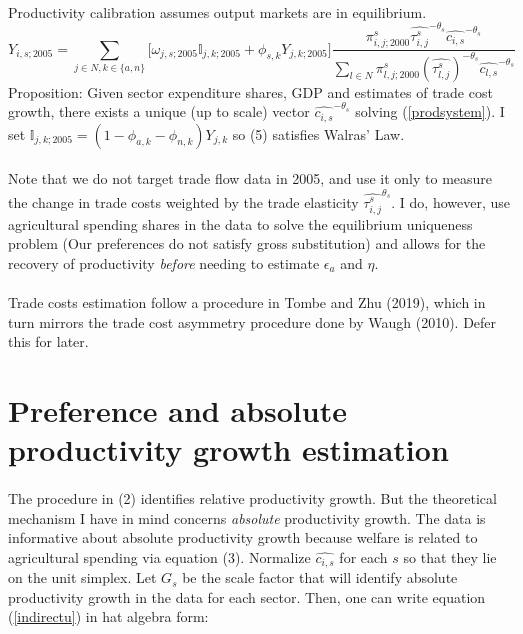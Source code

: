 \documentclass[]{article}
\begin{document}
\paragraph*{}
Productivity calibration assumes output markets are in equilibrium.
\begin{equation} \label{prodsystem}
	Y_{i, s; 2005} = \sum_{j \in N, k \in \{a, n\}}\bigg[\omega_{j, s; 2005}\mathbb{I}_{j, k; 2005} + \phi_{s, k}Y_{j, k; 2005}\bigg] \frac{\pi_{i, j; 2000}^{s}\hat{\tau^{s}_{i, j}}^{-\theta_{s}}\hat{c_{i, s}}^{-\theta_{s}}}{\sum_{l \in N}\pi_{l, j; 2000}^{s}(\hat{\tau_{l, j}^{s}})^{-\theta_{s}}\hat{c_{l, s}}^{-\theta_{s}}} 
\end{equation}
Proposition: Given sector expenditure shares, GDP and estimates of trade cost growth, there exists a unique (up to scale) vector $\hat{c_{i, s}}^{-\theta_{s}}$ solving (\ref{prodsystem}). I set $\mathbb{I}_{j, k; 2005} = (1-\phi_{a, k} - \phi_{n, k})Y_{j, k}$ so (5) satisfies Walras' Law. 
\paragraph*{}
Note that we do not target trade flow data in 2005, and use it only to measure the change in trade costs weighted by the trade elasticity $\hat{\tau^{s}_{i, j}}^{\theta_{s}}$. I do, however, use agricultural spending shares in the data to solve the equilibrium uniqueness problem (Our preferences do not satisfy gross substitution) and allows for the recovery of productivity \textit{before} needing to estimate $\epsilon_{a}$ and $\eta$. 
\paragraph*{}
Trade costs estimation follow a procedure in Tombe and Zhu (2019), which in turn mirrors the trade cost asymmetry procedure done by Waugh (2010). Defer this for later.

\section{Preference and absolute productivity growth estimation}
\paragraph{}
The procedure in (2) identifies relative productivity growth. But the theoretical mechanism I have in mind concerns \textit{absolute} productivity growth. The data is informative about absolute productivity growth because welfare is related to agricultural spending via equation (3). Normalize $\hat{c_{i, s}}$ for each $s$ so that they lie on the unit simplex. Let $G_{s}$ be the scale factor that will identify absolute productivity growth in the data for each sector. Then, one can write equation (\ref{indirectu}) in hat algebra form:
\end{document}
